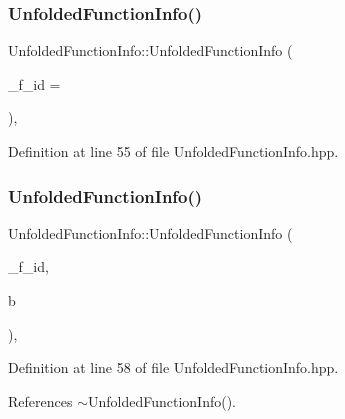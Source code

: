 \subsubsection{\texorpdfstring{Unfolded\+Function\+Info()}{UnfoldedFunctionInfo()}\hspace{0.1cm}{\footnotesize\ttfamily [1/2]}}
{\footnotesize\ttfamily Unfolded\+Function\+Info\+::\+Unfolded\+Function\+Info (\begin{DoxyParamCaption}\item[{unsigned int}]{\+\_\+f\+\_\+id = {} }\end{DoxyParamCaption})\hspace{0.3cm}{\ttfamily [inline]}, {\ttfamily [explicit]}}



Definition at line 55 of file Unfolded\+Function\+Info.\+hpp.

\mbox{\label{classUnfoldedFunctionInfo_a4c9c604772e8af984faeb4aac90f56bb}} 
\subsubsection{\texorpdfstring{Unfolded\+Function\+Info()}{UnfoldedFunctionInfo()}\hspace{0.1cm}{\footnotesize\ttfamily [2/2]}}
{\footnotesize\ttfamily Unfolded\+Function\+Info\+::\+Unfolded\+Function\+Info (\begin{DoxyParamCaption}\item[{unsigned int}]{\+\_\+f\+\_\+id,  }\item[{const \hyperlink{function__behavior_8hpp_a94872da12ed056b6ecf90456164e0213}{Function\+Behavior\+Const\+Ref}}]{b }\end{DoxyParamCaption})\hspace{0.3cm}{\ttfamily [inline]}, {\ttfamily [explicit]}}



Definition at line 58 of file Unfolded\+Function\+Info.\+hpp.



References $\sim$\+Unfolded\+Function\+Info().


